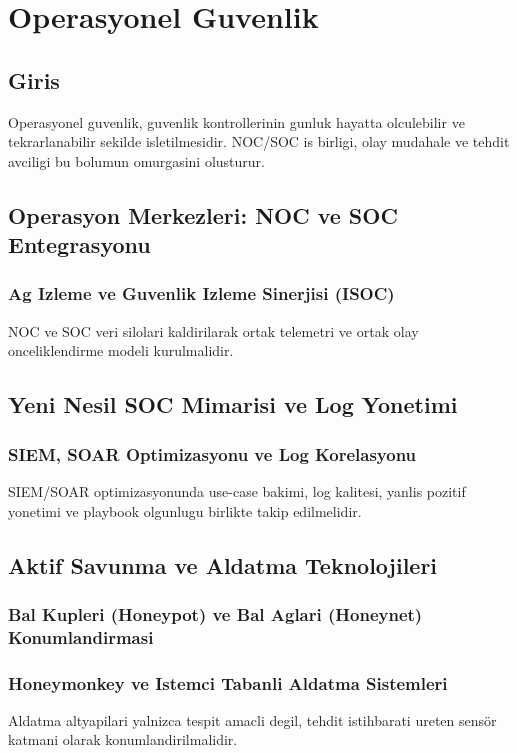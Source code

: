 ﻿\chapter{Operasyonel Guvenlik}

\section*{Giris}
Operasyonel guvenlik, guvenlik kontrollerinin gunluk hayatta olculebilir ve tekrarlanabilir sekilde isletilmesidir. NOC/SOC is birligi, olay mudahale ve tehdit avciligi bu bolumun omurgasini olusturur.

\section{Operasyon Merkezleri: NOC ve SOC Entegrasyonu}
\subsection{Ag Izleme ve Guvenlik Izleme Sinerjisi (ISOC)}
NOC ve SOC veri silolari kaldirilarak ortak telemetri ve ortak olay onceliklendirme modeli kurulmalidir.

\section{Yeni Nesil SOC Mimarisi ve Log Yonetimi}
\subsection{SIEM, SOAR Optimizasyonu ve Log Korelasyonu}
SIEM/SOAR optimizasyonunda use-case bakimi, log kalitesi, yanlis pozitif yonetimi ve playbook olgunlugu birlikte takip edilmelidir.

\section{Aktif Savunma ve Aldatma Teknolojileri}
\subsection{Bal Kupleri (Honeypot) ve Bal Aglari (Honeynet) Konumlandirmasi}
\subsection{Honeymonkey ve Istemci Tabanli Aldatma Sistemleri}
Aldatma altyapilari yalnizca tespit amacli degil, tehdit istihbarati ureten sensör katmani olarak konumlandirilmalidir.

